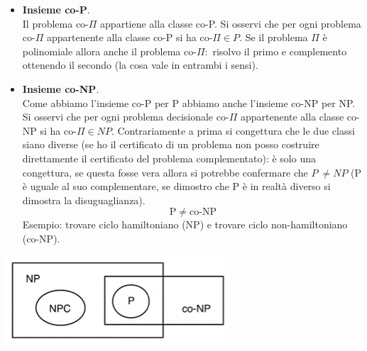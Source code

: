 \begin{itemize}
	\item \textbf{Insieme co-P}.\\
	Il problema co-$\Pi$ appartiene alla classe co-P. Si osservi che per ogni problema co-$\Pi$ appartenente alla classe co-P si ha co-$\Pi\in P$. Se il problema $\Pi$ è polinomiale allora anche il problema co-$\Pi$:\ risolvo il primo e complemento ottenendo il secondo (la cosa vale in entrambi i sensi). 
	
	\item \textbf{Insieme co-NP}.\\
	Come abbiamo l’insieme co-P per P abbiamo anche l’insieme co-NP per NP. Si osservi che per ogni problema decisionale co-$\Pi$ appartenente alla classe co-NP si ha co-$\Pi\in NP$. Contrariamente a prima si congettura che le due classi siano diverse (se ho il certificato di un problema non posso costruire direttamente il certificato del problema complementato): è solo una congettura, se questa fosse vera allora si potrebbe confermare che $P\ \neq NP$ (P è uguale al suo complementare, se dimostro che P è in realtà diverso si dimostra la disuguaglianza).
	\[\mathrm{P}\neq\text{co-}\mathrm{NP}\]
	Esempio: trovare ciclo hamiltoniano (NP) e trovare ciclo non-hamiltoniano (co-NP).
	
\end{itemize}
\begin{center}
	\includegraphics[scale=.8]{images/4.PNG}
\end{center}
